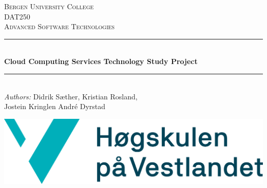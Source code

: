 \begin{titlepage}


\newcommand{\HRule}{\rule{\linewidth}{0.5mm}} %

\center %
\textsc{\LARGE Bergen University College}\\[1.5cm] %
\textsc{\Large DAT250}\\[0.5cm] %
\textsc{\large Advanced Software Technologies}\\[0.5cm] %
\HRule \\[0.4cm]
{ \huge \bfseries Cloud Computing Services Technology Study Project}\\[0.4cm] %
\HRule \\[1.5cm]


\large \emph{Authors:} Didrik Sæther, Kristian Rosland,\\ Jostein Kringlen André Dyrstad\\[2cm]


\centerline{\includegraphics[scale=0.20]{figures/logo}}\vspace{1.5cm}


\end{titlepage}
